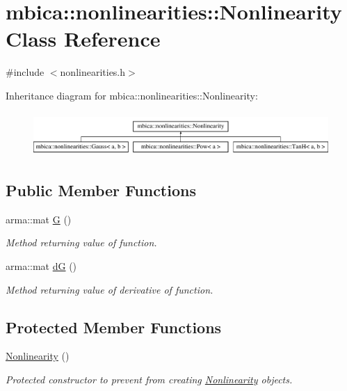 \hypertarget{classmbica_1_1nonlinearities_1_1_nonlinearity}{
\section{mbica::nonlinearities::Nonlinearity Class Reference}
\label{classmbica_1_1nonlinearities_1_1_nonlinearity}
}


{\ttfamily \#include $<$nonlinearities.h$>$}

Inheritance diagram for mbica::nonlinearities::Nonlinearity:\begin{figure}[H]
\begin{center}
\leavevmode
\includegraphics[height=1.681682cm]{classmbica_1_1nonlinearities_1_1_nonlinearity}
\end{center}
\end{figure}
\subsection*{Public Member Functions}
\begin{DoxyCompactItemize}
\item 
arma::mat \hyperlink{classmbica_1_1nonlinearities_1_1_nonlinearity_a2fdac4cb3e02508f70b79af06a9a6487}{G} ()
\begin{DoxyCompactList}\small\item\em Method returning value of function. \item\end{DoxyCompactList}\item 
arma::mat \hyperlink{classmbica_1_1nonlinearities_1_1_nonlinearity_a49e21ebf1f1f0d9e400b864cd75cec76}{dG} ()
\begin{DoxyCompactList}\small\item\em Method returning value of derivative of function. \item\end{DoxyCompactList}\end{DoxyCompactItemize}
\subsection*{Protected Member Functions}
\begin{DoxyCompactItemize}
\item 
\hyperlink{classmbica_1_1nonlinearities_1_1_nonlinearity_ab5cffa8d6f796bf97b2135f35c0b0d9a}{Nonlinearity} ()
\begin{DoxyCompactList}\small\item\em Protected constructor to prevent from creating \hyperlink{classmbica_1_1nonlinearities_1_1_nonlinearity}{Nonlinearity} objects. \item\end{DoxyCompactList}\end{DoxyCompactItemize}
